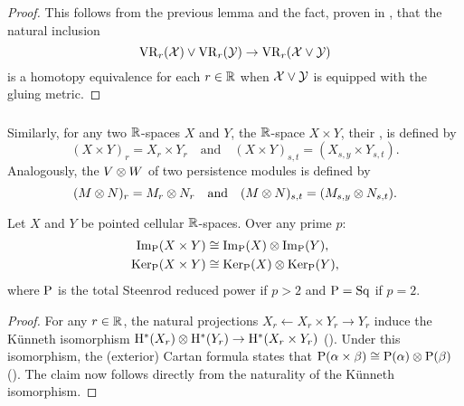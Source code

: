 \begin{proof}
	This follows from the previous lemma and the fact, proven in \cite[Prop.~1]{adamaszek2020homotopy}, that the natural inclusion
	\[
	\mathrm{VR}_r(\mathcal{X}) \vee \mathrm{VR}_r(\mathcal{Y}) \to \mathrm{VR}_r(\mathcal{X} \vee \mathcal{Y})
	\]
	is a homotopy equivalence for each $r \in \mathbb{R}$ when \(\mathcal{X} \vee \mathcal{Y}\) is equipped with the gluing metric.
\end{proof}

\subsubsection{}

Similarly, for any two $\mathbb{R}$-spaces $X$ and $Y$, the $\mathbb{R}$-space $X \times Y$, their , is defined by
\[
(X \times Y)_r = X_r \times Y_r \quad\text{and}\quad (X \times Y)_{s,t} = (X_{s,y} \times Y_{s,t}).
\]
Analogously, the  \(V \otimes W\) of two persistence modules is defined by
\[
(M \otimes N)_r = M_r \otimes N_r \quad\text{and}\quad (M \otimes N)_{s,t} = (M_{s,y} \otimes N_{s,t}).
\]


\medskip\lemma
Let $X$ and $Y$ be pointed cellular $\mathbb{R}$-spaces.
Over any prime \(p\):
\begin{align*}
	\operatorname{Im}_{\mathrm{P}}(X \times Y) &\cong \operatorname{Im}_{\mathrm{P}}(X) \otimes \operatorname{Im}_{\mathrm{P}}(Y),\\
	\operatorname{Ker}_{\mathrm{P}}(X \times Y) &\cong \operatorname{Ker}_{\mathrm{P}}(X) \otimes \operatorname{Ker}_{\mathrm{P}}(Y),
\end{align*}
where \(\mathrm{P}\) is the total Steenrod reduced power if \(p > 2\) and \(\mathrm{P} = \mathrm{Sq}\) if \(p = 2\).

\begin{proof}
	For any \(r \in \mathbb{R}\), the natural projections $X_r \leftarrow X_r \times Y_r \to Y_r$ induce the K\"unneth isomorphism $\mathrm{H}^*(X_r) \otimes \mathrm{H}^*(Y_r) \to \mathrm{H}^*(X_r \times Y_r)$ (\cite[Cor.~3B.7.]{hatcher2000}).
	Under this isomorphism, the (exterior) Cartan formula states that \(\mathrm{P}(\alpha \times \beta) \cong \mathrm{P}(\alpha) \otimes \mathrm{P}(\beta)\) (\cite[Cor.~2.7]{may1970general}).
	The claim now follows directly from the naturality of the K\"unneth isomorphism.
\end{proof}

